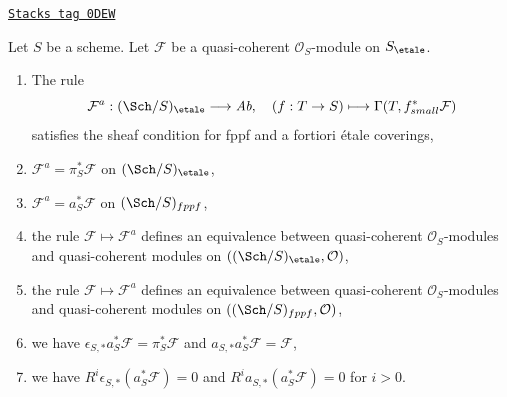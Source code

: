 \begin{lemma}
\label{etale-cohomology-lemma-review-quasi-coherent}
\href{https://stacks.math.columbia.edu/tag/0DEW}{\texttt{Stacks tag 0DEW}}

Let $S$ be a scheme. Let $\mathcal{F}$ be a quasi-coherent
$\mathcal{O}_S$-module on $S_\etale$.
\begin{enumerate}
\item The rule
$$
\mathcal{F}^a : (\Sch/S)_\etale \longrightarrow \textit{Ab},\quad
(f : T \to S) \longmapsto \Gamma(T, f_{small}^*\mathcal{F})
$$
satisfies the sheaf condition for fppf and a fortiori \'etale coverings,
\item $\mathcal{F}^a = \pi_S^*\mathcal{F}$ on $(\Sch/S)_\etale$,
\item $\mathcal{F}^a = a_S^*\mathcal{F}$ on $(\Sch/S)_{fppf}$,
\item the rule $\mathcal{F} \mapsto \mathcal{F}^a$ defines
an equivalence between quasi-coherent $\mathcal{O}_S$-modules
and quasi-coherent modules on
$((\Sch/S)_\etale, \mathcal{O})$,
\item the rule $\mathcal{F} \mapsto \mathcal{F}^a$ defines
an equivalence between quasi-coherent $\mathcal{O}_S$-modules
and quasi-coherent modules on
$((\Sch/S)_{fppf}, \mathcal{O})$,
\item we have $\epsilon_{S, *}a_S^*\mathcal{F} = \pi_S^*\mathcal{F}$
and $a_{S, *}a_S^*\mathcal{F} = \mathcal{F}$,
\item we have $R^i\epsilon_{S, *}(a_S^*\mathcal{F}) = 0$
and $R^ia_{S, *}(a_S^*\mathcal{F}) = 0$ for $i > 0$.
\end{enumerate}
\end{lemma}

